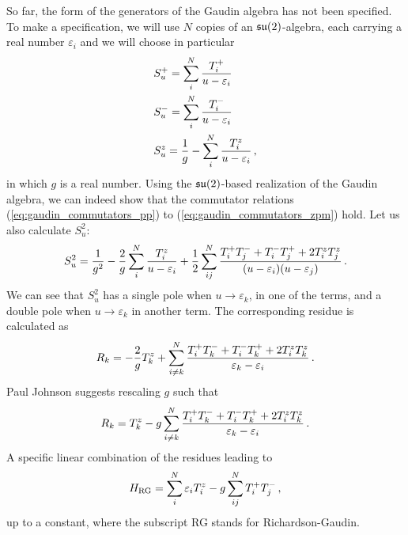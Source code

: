         So far, the form of the generators of the Gaudin algebra has not been specified. To make a specification, we will use $N$ copies of an $\operatorname{\mathfrak{su}}(2)$-algebra, each carrying a real number $\varepsilon_i$ and we will choose in particular
        \begin{align}
            & S^+_u = \sum_i^N \frac{T^+_i}{u - \varepsilon_i} \\
            & S^-_u = \sum_i^N \frac{T^-_i}{u - \varepsilon_i} \\
            & S^z_u = \frac{1}{g} - \sum_i^N \frac{T^z_i}{u - \varepsilon_i} \thinspace ,
        \end{align}
        in which $g$ is a real number. Using the $\operatorname{\mathfrak{su}}(2)$-based realization of the Gaudin algebra, we can indeed show that the commutator relations (\ref{eq:gaudin_commutators_pp}) to (\ref{eq:gaudin_commutators_zpm}) hold. Let us also calculate $S^2_u$:
        \begin{equation}
            S^2_u = \frac{1}{g^2} - \frac{2}{g} \sum_i^N \frac{T^z_i}{u - \varepsilon_i} + \frac{1}{2} \sum_{ij}^N \frac{T^+_i T^-_j + T^-_i T^+_j + 2 T^z_i T^z_j}{(u - \varepsilon_i)(u - \varepsilon_j)} \thinspace .
        \end{equation}
        We can see that $S^2_u$ has a single pole when $u \to \varepsilon_k$, in one of the terms, and a double pole when $u \to \varepsilon_k$ in another term. The corresponding residue is calculated as
        \begin{equation}
            R_k = - \frac{2}{g} T^z_k + \sum_{i \neq k}^N \frac{T^+_i T^-_k + T^-_i T^+_k + 2 T^z_i T^z_k}{\varepsilon_k - \varepsilon_i} \thinspace .
        \end{equation}
        Paul Johnson \cite{johnsonphd} suggests rescaling $g$ such that
        \begin{equation}
            R_k = T^z_k - g \sum_{i \neq k}^N \frac{T^+_i T^-_k + T^-_i T^+_k + 2 T^z_i T^z_k}{\varepsilon_k - \varepsilon_i} \thinspace .
        \end{equation}
        A specific linear combination \cite{johnsonphd} of the residues leading to
        \begin{equation}
            H_{\text{RG}} = \sum_i^N \varepsilon_i T^z_i - g \sum_{ij}^N T^+_i T^-_j \thinspace ,
        \end{equation}
        up to a constant, where the subscript RG stands for Richardson-Gaudin.
